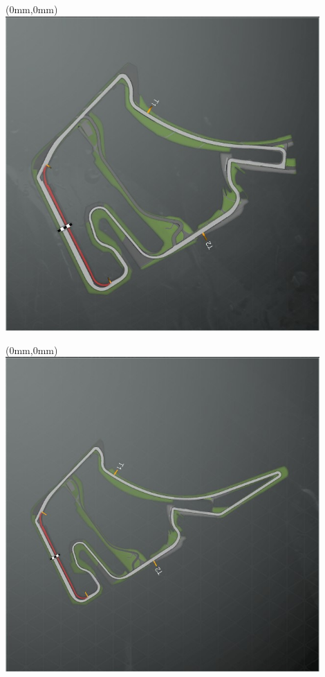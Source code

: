 \null\newpage
\begin{textblock*}{30mm}(0mm,0mm)%
\includegraphics[width=120mm]{TR/2015-05-20_00028.png}
\end{textblock*}
\null\newpage
\begin{textblock*}{30mm}(0mm,0mm)%
\includegraphics[width=120mm]{TR/2015-05-20_00027.png}
\end{textblock*}
